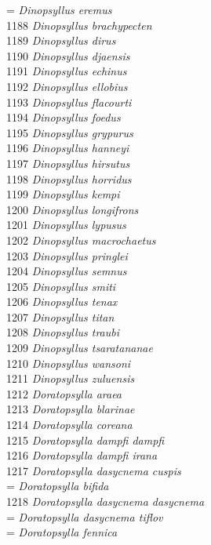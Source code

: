 \documentclass[
]{article}
\begin{document}
= \emph{Dinopsyllus eremus}\\
1188 \emph{Dinopsyllus brachypecten}\\
1189 \emph{Dinopsyllus dirus}\\
1190 \emph{Dinopsyllus djaensis}\\
1191 \emph{Dinopsyllus echinus}\\
1192 \emph{Dinopsyllus ellobius}\\
1193 \emph{Dinopsyllus flacourti}\\
1194 \emph{Dinopsyllus foedus}\\
1195 \emph{Dinopsyllus grypurus}\\
1196 \emph{Dinopsyllus hanneyi}\\
1197 \emph{Dinopsyllus hirsutus}\\
1198 \emph{Dinopsyllus horridus}\\
1199 \emph{Dinopsyllus kempi}\\
1200 \emph{Dinopsyllus longifrons}\\
1201 \emph{Dinopsyllus lypusus}\\
1202 \emph{Dinopsyllus macrochaetus}\\
1203 \emph{Dinopsyllus pringlei}\\
1204 \emph{Dinopsyllus semnus}\\
1205 \emph{Dinopsyllus smiti}\\
1206 \emph{Dinopsyllus tenax}\\
1207 \emph{Dinopsyllus titan}\\
1208 \emph{Dinopsyllus traubi}\\
1209 \emph{Dinopsyllus tsaratananae}\\
1210 \emph{Dinopsyllus wansoni}\\
1211 \emph{Dinopsyllus zuluensis}\\
1212 \emph{Doratopsylla araea}\\
1213 \emph{Doratopsylla blarinae}\\
1214 \emph{Doratopsylla coreana}\\
1215 \emph{Doratopsylla dampfi dampfi}\\
1216 \emph{Doratopsylla dampfi irana}\\
1217 \emph{Doratopsylla dasycnema cuspis}\\
= \emph{Doratopsylla bifida}\\
1218 \emph{Doratopsylla dasycnema dasycnema}\\
= \emph{Doratopsylla dasycnema tiflov}\\
= \emph{Doratopsylla fennica}\\
\end{document}
